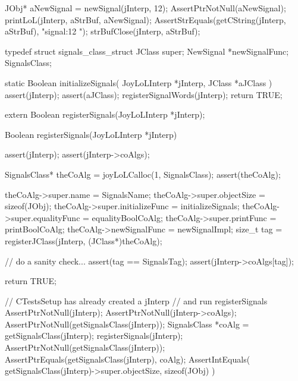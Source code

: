   JObj* aNewSignal = newSignal(jInterp, 12);
  AssertPtrNotNull(aNewSignal);
  printLoL(jInterp, aStrBuf, aNewSignal);
  AssertStrEquals(getCString(jInterp, aStrBuf), "signal:12 ");
  strBufClose(jInterp, aStrBuf);
\stopCTest
\stopTestCase
\stopTestSuite

\startTestSuite[registerSignals]

\startCHeader
typedef struct signals_class_struct {
  JClass     super;
  NewSignal *newSignalFunc;
} SignalsClass;

\stopCHeader

\startCCode
static Boolean initializeSignals(
  JoyLoLInterp *jInterp,
  JClass       *aJClass
) {
  assert(jInterp);
  assert(aJClass);
  registerSignalWords(jInterp);
  return TRUE;
}
\stopCCode

\startCHeader
extern Boolean registerSignals(JoyLoLInterp *jInterp);
\stopCHeader
{}

\startCCode
Boolean registerSignals(JoyLoLInterp *jInterp) {
  assert(jInterp);
  assert(jInterp->coAlgs);
  
  SignalsClass* theCoAlg
    = joyLoLCalloc(1, SignalsClass);
  assert(theCoAlg);
  
  theCoAlg->super.name           = SignalsName;
  theCoAlg->super.objectSize     = sizeof(JObj);
  theCoAlg->super.initializeFunc = initializeSignals;
  theCoAlg->super.equalityFunc   = equalityBoolCoAlg;
  theCoAlg->super.printFunc      = printBoolCoAlg;
  theCoAlg->newSignalFunc        = newSignalImpl;
  size_t tag =
    registerJClass(jInterp, (JClass*)theCoAlg);
  
  // do a sanity check...
  assert(tag == SignalsTag);
  assert(jInterp->coAlgs[tag]);
   
  return TRUE;
}
\stopCCode


\startCTest
  // CTestsSetup has already created a jInterp
  // and run registerSignals
  AssertPtrNotNull(jInterp);
  AssertPtrNotNull(jInterp->coAlgs);
  AssertPtrNotNull(getSignalsClass(jInterp));
  SignalsClass *coAlg = getSignalsClass(jInterp);
  registerSignals(jInterp);
  AssertPtrNotNull(getSignalsClass(jInterp));
  AssertPtrEquals(getSignalsClass(jInterp), coAlg);
  AssertIntEquals(
    getSignalsClass(jInterp)->super.objectSize,
    sizeof(JObj)
  )
\stopCTest
\stopTestCase
\stopTestSuite
